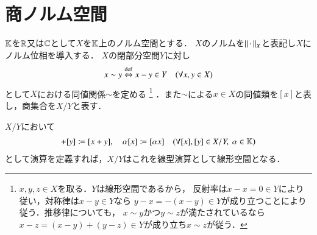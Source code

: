 \chapter{商ノルム空間}
	$\mathbb{K}$を$\mathbb{R}$又は$\mathbb{C}$として$X$を$\mathbb{K}$上のノルム空間とする．
	$X$のノルムを$\left\|\, \cdot\, \right\|_{X}$と表記し$X$にノルム位相を導入する．
	$X$の閉部分空間$Y$に対し
	\begin{align}
		x \sim y \overset{\mathrm{def}}{\Leftrightarrow} x - y \in Y \quad (\forall x,y \in X)
	\end{align}
	として$X$における同値関係$\sim$を定める
	\footnote{
		$x,y,z \in X$を取る．$Y$は線形空間であるから，
		反射率は$x - x = 0 \in Y$により従い，対称律は$x - y \in Y$なら
		$y - x = -(x - y) \in Y$が成り立つことにより従う．推移律についても，
		$x \sim y$かつ$y \sim z$が満たされているなら
		$x - z = (x - y) + (y - z) \in Y$が成り立ち$x \sim z$が従う．
	}
	．また$\sim$による$x \in X$の同値類を$[x]$と表し，商集合を$X/Y$と表す．
	
	\begin{screen}
		\begin{thm}[商集合における線型演算]
			$X/Y$において
			\begin{align}
				[x] + [y] \coloneqq [x + y], \quad
				\alpha [x] \coloneqq [\alpha x] \quad (\forall [x],[y] \in X/Y,\ \alpha \in \K)
				\label{eq:quotient_set_linear_calculation_1}
			\end{align}
			として演算を定義すれば，$X/Y$はこれを線型演算として線形空間となる．
		\end{thm}
	\end{screen}
	
